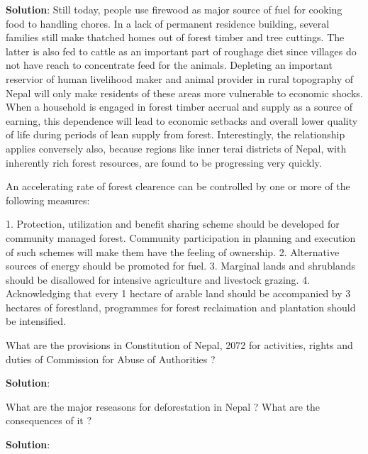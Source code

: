 \documentclass[
  openany]{book}
\newcommand{\question}{\item}
\newenvironment{solution}{ {\bfseries Solution}:}{}
\begin{document}
\begin{questions}
\begin{solution}
Still today, people use firewood as major source of fuel for cooking food to handling chores. In a lack of permanent residence building, several families still make thatched homes out of forest timber and tree cuttings. The latter is also fed to cattle as an important part of roughage diet since villages do not have reach to concentrate feed for the animals. Depleting an important reservior of human livelihood maker and animal provider in rural topography of Nepal will only make residents of these areas more vulnerable to economic shocks. When a household is engaged in forest timber accrual and supply as a source of earning, this dependence will lead to economic setbacks and overall lower quality of life during periods of lean supply from forest. Interestingly, the relationship applies conversely also, because regions like inner terai districts of Nepal, with inherently rich forest resources, are found to be progressing very quickly.

An accelerating rate of forest clearence can be controlled by one or more of the following measures:

1. Protection, utilization and benefit sharing scheme should be developed for community managed forest. Community participation in planning and execution of such schemes will make them have the feeling of ownership.
2. Alternative sources of energy should be promoted for fuel.
3. Marginal lands and shrublands should be disallowed for intensive agriculture and livestock grazing.
4. Acknowledging that every 1 hectare of arable land should be accompanied by 3 hectares of forestland, programmes for forest reclaimation and plantation should be intensified.

\end{solution}

\question What are the provisions in Constitution of Nepal, 2072 for activities, rights and duties of Commission for Abuse of Authorities ?

\begin{solution}

\end{solution}

\question What are the major reseasons for deforestation in Nepal ? What are the consequences of it ?

\begin{solution}


\end{solution}
\end{questions}
\end{document}
